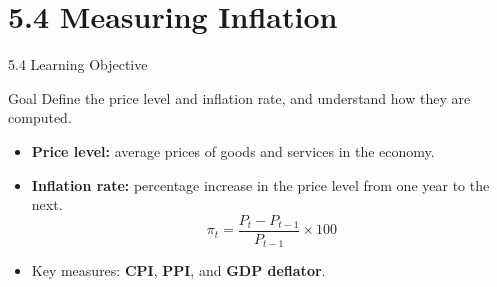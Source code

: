 \documentclass[aspectratio=169]{beamer}
\begin{document}
\section{5.4 Measuring Inflation}

\begin{frame}{5.4 Learning Objective}
\transfade
\begin{block}{Goal}
Define the price level and inflation rate, and understand how they are computed.
\end{block}
\begin{itemize}[<+->]
  \item \textbf{Price level:} average prices of goods and services in the economy.
  \item \textbf{Inflation rate:} percentage increase in the price level from one year to the next.
  \[
    \pi_t = \frac{P_t - P_{t-1}}{P_{t-1}} \times 100
  \]
  \item Key measures: \textbf{CPI}, \textbf{PPI}, and \textbf{GDP deflator}.
\end{itemize}
\end{frame}
\end{document}
